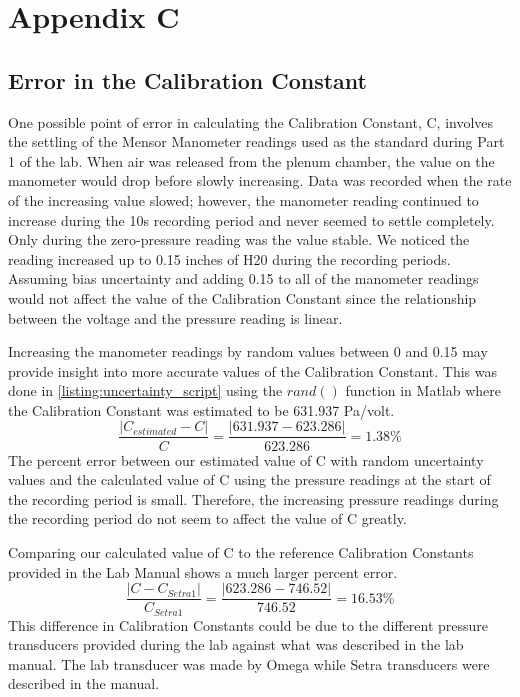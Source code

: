 \chapter{Appendix C}
\label{cp:C_error}

\section{Error in the Calibration Constant}
One possible point of error in calculating the Calibration Constant, C, involves the settling of the Mensor Manometer readings used as the standard during Part 1 of the lab. When air was released from the plenum chamber, the value on the manometer would drop before slowly increasing. Data was recorded when the rate of the increasing value slowed; however, the manometer reading continued to increase during the 10s recording period and never seemed to settle completely. Only during the zero-pressure reading was the value stable. We noticed the reading increased up to 0.15 inches of H20 during the recording periods. Assuming bias uncertainty and adding 0.15 to all of the manometer readings would not affect the value of the Calibration Constant since the relationship between the voltage and the pressure reading is linear. 

Increasing the manometer readings by random values between 0 and 0.15 may provide insight into more accurate values of the Calibration Constant. This was done in \autoref{listing:uncertainty_script} using the $rand()$ function in Matlab where the Calibration Constant was estimated to be 631.937 Pa/volt. 
\begin{equation}
    \frac{|C_{estimated} - C|}{C} = \frac{|631.937 - 623.286|}{623.286} = 1.38\%
\end{equation}
The percent error between our estimated value of C with random uncertainty values and the calculated value of C using the pressure readings at the start of the recording period is small. Therefore, the increasing pressure readings during the recording period do not seem to affect the value of C greatly.

Comparing our calculated value of C to the reference Calibration Constants provided in the Lab Manual shows a much larger percent error. 
\begin{equation}
    \frac{|C - C_{Setra1}|}{C_{Setra1}} = \frac{|623.286 - 746.52|}{746.52} = 16.53\%
\end{equation}
This difference in Calibration Constants could be due to the different pressure transducers provided during the lab against what was described in the lab manual. The lab transducer was made by Omega while Setra transducers were described in the manual.
